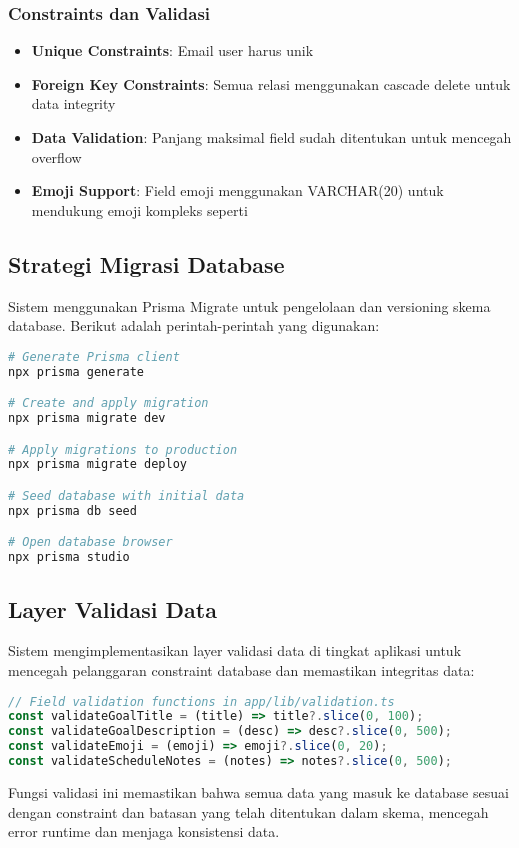 \subsubsection{Constraints dan Validasi}

\begin{itemize}
\item \textbf{Unique Constraints}: Email user harus unik
\item \textbf{Foreign Key Constraints}: Semua relasi menggunakan cascade delete untuk data integrity
\item \textbf{Data Validation}: Panjang maksimal field sudah ditentukan untuk mencegah overflow
\item \textbf{Emoji Support}: Field emoji menggunakan VARCHAR(20) untuk mendukung emoji kompleks seperti 🚴‍♂️
\end{itemize}

\subsection{Strategi Migrasi Database}

Sistem menggunakan Prisma Migrate untuk pengelolaan dan versioning skema database. Berikut adalah perintah-perintah yang digunakan:

\begin{lstlisting}[language=bash, caption=Prisma Migration Commands]
# Generate Prisma client
npx prisma generate

# Create and apply migration
npx prisma migrate dev

# Apply migrations to production
npx prisma migrate deploy

# Seed database with initial data
npx prisma db seed

# Open database browser
npx prisma studio
\end{lstlisting}

\subsection{Layer Validasi Data}

Sistem mengimplementasikan layer validasi data di tingkat aplikasi untuk mencegah pelanggaran constraint database dan memastikan integritas data:

\begin{lstlisting}[language=JavaScript, caption=Data Validation Functions]
// Field validation functions in app/lib/validation.ts
const validateGoalTitle = (title) => title?.slice(0, 100);
const validateGoalDescription = (desc) => desc?.slice(0, 500);
const validateEmoji = (emoji) => emoji?.slice(0, 20);
const validateScheduleNotes = (notes) => notes?.slice(0, 500);
\end{lstlisting}

Fungsi validasi ini memastikan bahwa semua data yang masuk ke database sesuai dengan constraint dan batasan yang telah ditentukan dalam skema, mencegah error runtime dan menjaga konsistensi data.
